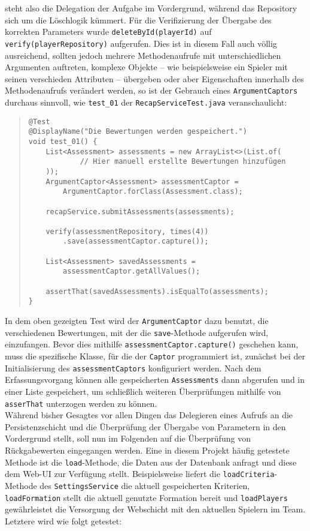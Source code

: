 steht also die Delegation der Aufgabe im Vordergrund, während das Repository sich 
um die Löschlogik kümmert. Für die Verifizierung der Übergabe des korrekten 
Parameters wurde \texttt{deleteById(playerId)} auf \texttt{verify(playerRepository)} 
aufgerufen. Dies ist in diesem Fall auch völlig ausreichend, sollten jedoch mehrere 
Methodenaufrufe mit unterschiedlichen Argumenten auftreten, komplexe Objekte -- wie 
beispielsweise ein Spieler mit seinen verschieden Attributen -- übergeben oder aber 
Eigenschaften innerhalb des Methodenaufrufs verändert werden, so ist der Gebrauch 
eines \texttt{ArgumentCaptors} durchaus sinnvoll, wie \texttt{test\_01} der 
\texttt{RecapServiceTest.java} veranschaulicht: 

\begin{quote}
\begin{verbatim}
@Test
@DisplayName("Die Bewertungen werden gespeichert.")
void test_01() {
    List<Assessment> assessments = new ArrayList<>(List.of(
            // Hier manuell erstellte Bewertungen hinzufügen 
    ));
    ArgumentCaptor<Assessment> assessmentCaptor = 
        ArgumentCaptor.forClass(Assessment.class);

    recapService.submitAssessments(assessments);

    verify(assessmentRepository, times(4))
        .save(assessmentCaptor.capture());

    List<Assessment> savedAssessments = 
        assessmentCaptor.getAllValues();

    assertThat(savedAssessments).isEqualTo(assessments);
}
\end{verbatim}
\end{quote}

In dem oben gezeigten Test wird der \texttt{ArgumentCaptor} dazu benutzt, die 
verschiedenen Bewertungen, mit der die \texttt{save}-Methode aufgerufen wird, 
einzufangen. Bevor dies mithilfe \texttt{assessmentCaptor.capture()} geschehen kann, 
muss die spezifische Klasse, für die der \texttt{Captor} programmiert ist, zunächst 
bei der Initialisierung des \texttt{assessmentCaptors} konfiguriert werden. Nach dem 
Erfassungsvorgang können alle gespeicherten \texttt{Assessments} dann abgerufen und 
in einer Liste gespeichert, um schließlich weiteren Überprüfungen mithilfe von 
\texttt{asserThat} unterzogen werden zu können. \\ 
Während bisher Gesagtes vor allen Dingen das Delegieren eines Aufrufs an die 
Persistenzschicht und die Überprüfung der Übergabe von Parametern in den Vordergrund 
stellt, soll nun im Folgenden auf die Überprüfung von Rückgabewerten eingegangen 
werden. Eine in diesem Projekt häufig getestete Methode ist die 
\texttt{load}-Methode, die Daten aus der Datenbank anfragt und diese dem Web-UI zur 
Verfügung stellt. Beispielsweise liefert die \texttt{loadCriteria}-Methode des 
\texttt{SettingsService} die aktuell gespeicherten Kriterien, \texttt{loadFormation} 
stellt die aktuell genutzte Formation bereit und \texttt{loadPlayers} gewährleistet 
die Versorgung der Webschicht mit den aktuellen Spielern im Team. Letztere wird wie folgt getestet: 

